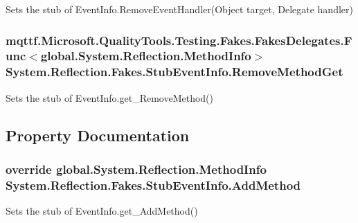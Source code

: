 Sets the stub of Event\-Info.\-Remove\-Event\-Handler(\-Object target, Delegate handler)

\hypertarget{class_system_1_1_reflection_1_1_fakes_1_1_stub_event_info_a23f7c867756dc68e1f577faa3d73d73d}{
\subsubsection[{Remove\-Method\-Get}]{\setlength{\rightskip}{0pt plus 5cm}mqttf.\-Microsoft.\-Quality\-Tools.\-Testing.\-Fakes.\-Fakes\-Delegates.\-Func$<$global.\-System.\-Reflection.\-Method\-Info$>$ System.\-Reflection.\-Fakes.\-Stub\-Event\-Info.\-Remove\-Method\-Get}}\label{class_system_1_1_reflection_1_1_fakes_1_1_stub_event_info_a23f7c867756dc68e1f577faa3d73d73d}


Sets the stub of Event\-Info.\-get\-\_\-\-Remove\-Method()



\subsection{Property Documentation}
\hypertarget{class_system_1_1_reflection_1_1_fakes_1_1_stub_event_info_a81e931c218dd8407b89ca9a394e5cac3}{
\subsubsection[{Add\-Method}]{\setlength{\rightskip}{0pt plus 5cm}override global.\-System.\-Reflection.\-Method\-Info System.\-Reflection.\-Fakes.\-Stub\-Event\-Info.\-Add\-Method\hspace{0.3cm}{\ttfamily [get]}}}\label{class_system_1_1_reflection_1_1_fakes_1_1_stub_event_info_a81e931c218dd8407b89ca9a394e5cac3}


Sets the stub of Event\-Info.\-get\-\_\-\-Add\-Method()

